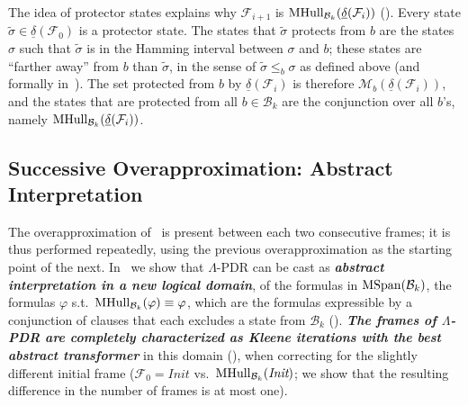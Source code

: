 \documentclass[acmsmall,screen]{acmart}
\newcommand{\Init}{{\textit{Init}}}
\newcommand{\tr}{\delta}
\newcommand{\Frame}{\mathcal{F}}
\newcommand{\reflextr}[1]{\underline{#1}}
\newcommand{\postimage}[2]{{\reflextr{#1}}({#2})}
\newcommand{\bkwrch}[1]{\mathcal{B}_{#1}}
\newcommand{\monox}[2]{\mathcal{M}_{#2}({#1})}
\newcommand{\mspan}[1]{{\rm MSpan}({#1})}
\newcommand{\bkwspan}[1]{\mspan{\bkwrch{#1}}}
\newcommand{\mhull}[2]{{\rm MHull}_{#2}({#1})}
\begin{document}
The idea of protector states explains why $\Frame_{i+1}$ is $\mhull{\postimage{\tr}{\Frame_i}}{\bkwrch{k}}$ ().
%
Every state $\widetilde{\sigma} \in \postimage{\tr}{\Frame_0}$ is a protector state. The states that $\widetilde{\sigma}$ protects from $b$ are the states $\sigma$ such that $\widetilde{\sigma}$ is in the Hamming interval between $\sigma$ and $b$; these states are ``farther away'' from $b$ than $\widetilde{\sigma}$, in the sense of $\widetilde{\sigma} \leq_b \sigma$ as defined above (and formally in~).
The set protected from $b$ by $\postimage{\tr}{\Frame_i}$ is therefore $\monox{\postimage{\tr}{\Frame_i}}{b}$, and the states that are protected from all $b \in \bkwrch{k}$ are the conjunction over all $b$'s, namely $\mhull{\postimage{\tr}{\Frame_{i}}}{\bkwrch{k}}$.

%


%
%

%
%
%

\subsection{Successive Overapproximation: Abstract Interpretation}
\label{sec:overview-successive}
%
The overapproximation of~ is present between each two consecutive frames; it is thus performed repeatedly, using the previous overapproximation as the starting point of the next. In~ we show that $\Lambda$-PDR can be cast as \textbf{\textit{abstract interpretation in a new logical domain}}, of the formulas in $\bkwspan{k}$, the formulas $\varphi$ s.t.\ $\mhull{\varphi}{\bkwrch{k}} \equiv \varphi$, which are the formulas expressible by a conjunction of clauses that each excludes a state from $\bkwrch{k}$ (). \textbf{\textit{The frames of $\Lambda$-PDR are completely characterized as Kleene iterations with the best abstract transformer}} in this domain (), when correcting for the slightly different initial frame ($\Frame_0=\Init$ vs.\ $\mhull{\Init}{\bkwrch{k}}$; we show that the resulting difference in the number of frames is at most one).
\end{document}
